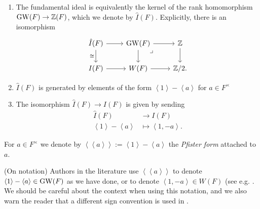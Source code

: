 \documentclass[11pt,openany]{book}
\newcommand{\Pfister}[1]{\left\langle\! \left\langle #1 \right\rangle\! \right\rangle}
\begin{document}
\begin{proposition} $\ $
\begin{enumerate}
    \item The fundamental ideal is equivalently the kernel of the rank homomorphism $\mathrm{GW}(F) \to \mathbb{Z}(F)$, which we denote by $\hat{I}(F)$. Explicitly, there is an isomorphism
\[ \begin{tikzcd}
    \hat{I}(F)\rar\dar["\cong" left] & \GW(F)\rar\dar\pb & \Z\dar\\
    I(F) \rar & W(F)\rar & \Z/2.
\end{tikzcd} \]

\item $\hat{I}(F)$ is generated by elements of the form $\left\langle 1 \right\rangle - \left\langle a \right\rangle$ for $a\in F^\times$

\item The isomorphism $\hat{I}(F) \to I(F)$ is given by sending
\begin{align*}
    \hat{I}(F) &\to I(F) \\
    \left\langle 1 \right\rangle - \left\langle a \right\rangle &\mapsto \left\langle 1,-a \right\rangle.
\end{align*}
\end{enumerate}
\end{proposition}

\begin{definition} For $a \in F^\times$ we denote by $\Pfister{a}:= \left\langle 1 \right\rangle - \left\langle a \right\rangle$ the \textit{Pfister form} attached to $a$.
\end{definition}

\begin{remark} (On notation) Authors in the literature use $\Pfister{a}$ to denote $\left\langle 1 \right\rangle - \left\langle a \right\rangle \in \mathrm{GW}(F)$ as we have done, or to denote $\left\langle 1,-a \right\rangle\in W(F)$ (see e.g. \cite[p.~24]{EKM}. We should be careful about the context when using this notation, and we also warn the reader that a different sign convention is used in \cite[X.1.1]{Lam-quad}.
\end{remark}
\end{document}
